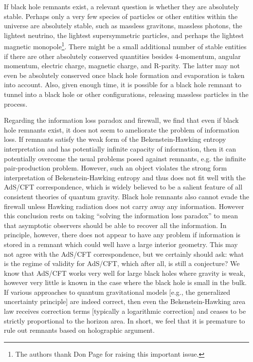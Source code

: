 \documentclass[12pt]{article}
\newcommand{\2}{$^2$}
\newcommand{\3}{$^3$}
\newcommand{\4}{$_4$}
\newcommand{\5}{$_5$}
\begin{document}
{\color{black} If black hole remnants exist, a relevant question is whether they are absolutely stable. Perhaps only a very few species of particles or
other entities within the universe are absolutely stable, such as massless gravitons, massless photons, the lightest neutrino, the lightest supersymmetric
particles, and perhaps the lightest magnetic monopole\footnote{\color{black}The authors thank Don Page for raising this important issue.}. There might be a small additional number of stable entities if there are other
absolutely conserved quantities besides 4-momentum, angular momentum,
electric charge, magnetic charge, and R-parity. The latter may not even be absolutely conserved once black hole formation and evaporation is taken into account. Also, given enough time, it is possible for a black hole remnant to tunnel into a black hole or other configurations, releasing massless particles in the process.}

Regarding the information loss paradox and firewall, we find that even if black hole remnants exist, it does not seem to ameliorate the problem of information loss. If remnants satisfy the weak form of the Bekenstein-Hawking entropy interpretation and has potentially infinite capacity of information, then it can potentially overcome the usual problems posed against remnants, e.g. the infinite pair-production problem. However, such an object violates the strong form interpretation of Bekenstein-Hawking entropy and thus does not fit well with the AdS/CFT correspondence, which is widely believed to be a salient feature of all consistent theories of quantum gravity. Black hole remnants also cannot evade the firewall unless Hawking radiation does not carry away any information.  
However this conclusion rests on taking ``solving the information loss paradox'' to mean that asymptotic observers should be able to recover all the information. In principle, however, there does not appear to have any problem if information is stored in a remnant which could well have a large interior geometry. This may not agree with the AdS/CFT correspondence, but we certainly should ask: what is the regime of validity for AdS/CFT, which after all, is still a conjecture? We know that AdS/CFT works very well for large black holes where gravity is weak, however very little is known in the case where the black hole is small in the bulk. If various approaches to quantum gravitational models [e.g., the generalized uncertainty principle] are indeed correct, then even the Bekenstein-Hawking area law receives correction terms [typically a logarithmic correction] and ceases to be strictly proportional to the horizon area. In short, we feel that it is premature to rule out remnants based on holographic argument. 
\end{document}
